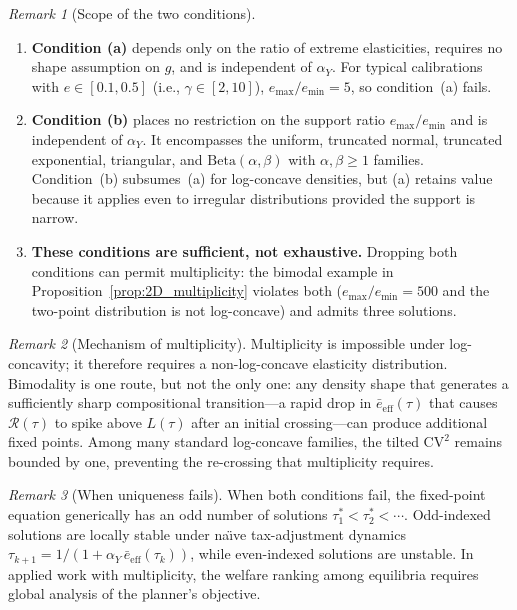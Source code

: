 \documentclass[12pt,a4paper]{article}
\theoremstyle{definition}
\theoremstyle{plain}
\theoremstyle{remark}
\newtheorem{remark}{Remark}[section]
\newcommand{\calR}{\mathcal{R}}
\begin{document}
\begin{remark}[Scope of the two conditions]
\label{rem:uniqueness_scope}
\leavevmode
\begin{enumerate}[label=(\roman*)]
  \item \textbf{Condition (a)} depends only on the ratio of
    extreme elasticities, requires no shape assumption on $g$,
    and is independent of $\alpha_Y$.  For typical calibrations
    with $e \in [0.1, 0.5]$ (i.e., $\gamma \in [2, 10]$),
    $e_{\max}/e_{\min} = 5$, so condition~(a) fails.

  \item \textbf{Condition (b)} places no restriction on the
    support ratio $e_{\max}/e_{\min}$ and is independent of
    $\alpha_Y$.  It encompasses the uniform, truncated normal,
    truncated exponential, triangular, and
    $\mathrm{Beta}(\alpha,\beta)$ with $\alpha,\beta \geq 1$
    families.  Condition~(b) subsumes~(a) for log-concave
    densities, but (a) retains value because it applies even to
    irregular distributions provided the support is narrow.

  \item \textbf{These conditions are sufficient, not exhaustive.}
    Dropping both conditions can permit multiplicity: the bimodal
    example in Proposition~\ref{prop:2D_multiplicity} violates
    both ($e_{\max}/e_{\min} = 500$ and the two-point
    distribution is not log-concave) and admits three solutions.
\end{enumerate}
\end{remark}

\begin{remark}[Mechanism of multiplicity]
\label{rem:multiplicity_mechanism}
Multiplicity is impossible under log-concavity; it therefore
requires a non-log-concave elasticity distribution.  Bimodality
is one route, but not the only one: any density shape that
generates a sufficiently sharp compositional transition---a
rapid drop in $\bar{e}_{\mathrm{eff}}(\tau)$ that causes
$\calR(\tau)$ to spike above $L(\tau)$ after an initial
crossing---can produce additional fixed points.  Among many
standard log-concave families, the tilted $\mathrm{CV}^2$
remains bounded by one, preventing the re-crossing that
multiplicity requires.
\end{remark}

\begin{remark}[When uniqueness fails]
\label{rem:selection}
When both conditions fail, the fixed-point equation generically
has an odd number of solutions $\tau_1^* < \tau_2^* < \cdots$.
Odd-indexed solutions are locally stable under na\"{\i}ve
tax-adjustment dynamics
$\tau_{k+1} = 1/(1 + \alpha_Y\,\bar{e}_{\mathrm{eff}}(\tau_k))$,
while even-indexed solutions are unstable.  In applied work with
multiplicity, the welfare ranking among equilibria requires
global analysis of the planner's objective.
\end{remark}
\end{document}
